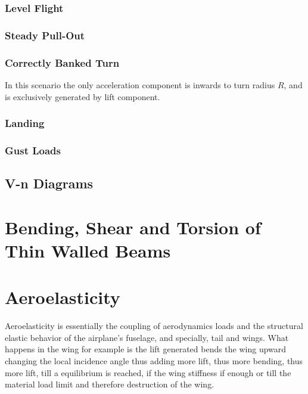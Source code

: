 \subsubsection{Level Flight}

\subsubsection{Steady Pull-Out}

\subsubsection{Correctly Banked Turn}
In this scenario the only acceleration component is inwards to turn radius $R$, and is exclusively generated by lift component.


\subsubsection{Landing}

\subsubsection{Gust Loads}



\subsection{V-n Diagrams}




\newpage
\section{Bending, Shear and Torsion of Thin Walled Beams}




\newpage
\section{Aeroelasticity}
Aeroelasticity is essentially the coupling of aerodynamics loads and the structural elastic behavior of the airplane's fuselage, and specially, tail and wings. What happens in the wing for example is the lift generated bends the wing upward changing the local incidence angle thus adding more lift, thus more bending, thus more lift, till a equilibrium is reached, if the wing stiffness if enough or till the material load limit and therefore destruction of the wing.

